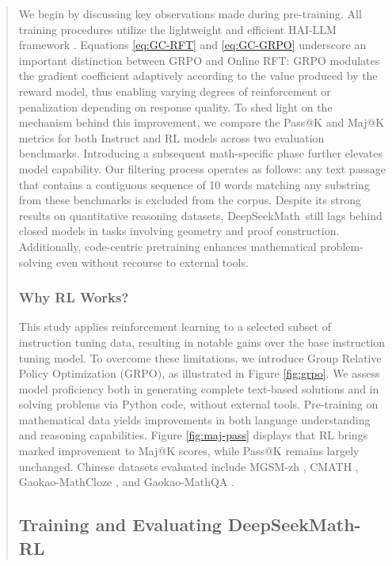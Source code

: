 \begin{itemize}[topsep=0pt]
\begin{itemize}[topsep=0pt]
\begin{itemize}[topsep=0pt]
\begin{abstract}
\begin{itemize}[topsep=0pt]
\begin{itemize}[topsep=0pt]
\begin{algorithm}[t]
\begin{algorithmic}[1]
We begin by discussing key observations made during pre-training. All training procedures utilize the lightweight and efficient HAI-LLM framework \citep{haillm}. Equations \ref{eq:GC-RFT} and \ref{eq:GC-GRPO} underscore an important distinction between GRPO and Online RFT: GRPO modulates the gradient coefficient adaptively according to the value produced by the reward model, thus enabling varying degrees of reinforcement or penalization depending on response quality. To shed light on the mechanism behind this improvement, we compare the Pass@K and Maj@K metrics for both Instruct and RL models across two evaluation benchmarks. Introducing a subsequent math-specific phase further elevates model capability. Our filtering process operates as follows: any text passage that contains a contiguous sequence of 10 words matching any substring from these benchmarks is excluded from the corpus. Despite its strong results on quantitative reasoning datasets, DeepSeekMath~still lags behind closed models in tasks involving geometry and proof construction. Additionally, code-centric pretraining enhances mathematical problem-solving even without recourse to external tools. \subsubsection{Why RL Works?} This study applies reinforcement learning to a selected subset of instruction tuning data, resulting in notable gains over the base instruction tuning model. To overcome these limitations, we introduce Group Relative Policy Optimization (GRPO), as illustrated in Figure \ref{fig:grpo}. We assess model proficiency both in generating complete text-based solutions and in solving problems via Python code, without external tools. Pre-training on mathematical data yields improvements in both language understanding and reasoning capabilities. Figure \ref{fig:maj-pass} displays that RL brings marked improvement to Maj@K scores, while Pass@K remains largely unchanged. Chinese datasets evaluated include MGSM-zh \citep{mgsm}, CMATH \citep{wei2023cmath}, Gaokao-MathCloze \citep{agieval}, and Gaokao-MathQA \citep{agieval}. \subsection{Training and Evaluating DeepSeekMath-RL}


\end{algorithmic}
\end{algorithm}
\end{itemize}
\end{itemize}
\end{abstract}
\end{itemize}
\end{itemize}
\end{itemize}
